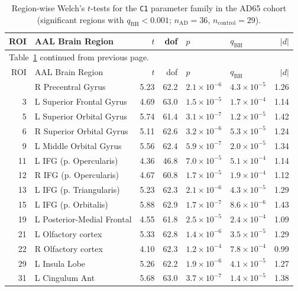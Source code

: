 \documentclass[11pt]{article}
\begin{document}
\begin{longtable}{r p{} r r l l r}
\caption{Region-wise Welch's $t$-tests for the \texttt{C1} parameter family in the AD65 cohort (significant regions with $q_{\mathrm{BH}}<0.001$; $n_{\mathrm{AD}}=36$, $n_{\mathrm{control}}=29$).}
\label{tab:supp_ad65_c1_stats}\\
\toprule
ROI & AAL Brain Region & $t$ & dof & $p$ & $q_{\mathrm{BH}}$ & $|d|$ \\
\midrule
\endfirsthead
\multicolumn{7}{l}{\small Table~\ref{tab:supp_ad65_c1_stats} continued from previous page.}\\
\toprule
ROI & AAL Brain Region & $t$ & dof & $p$ & $q_{\mathrm{BH}}$ & $|d|$ \\
\midrule
\endhead
\bottomrule
\endfoot
2  & R Precentral Gyrus & 5.23 & 62.2 & $2.1\times10^{-6}$ & $4.3\times10^{-5}$ & 1.26 \\
3  & L Superior Frontal Gyrus & 4.69 & 63.0 & $1.5\times10^{-5}$ & $1.7\times10^{-4}$ & 1.14 \\
5  & L Superior Orbital Gyrus & 5.74 & 61.4 & $3.1\times10^{-7}$ & $1.2\times10^{-5}$ & 1.42 \\
6  & R Superior Orbital Gyrus & 5.11 & 62.6 & $3.2\times10^{-6}$ & $5.3\times10^{-5}$ & 1.24 \\
9  & L Middle Orbital Gyrus & 5.56 & 62.4 & $5.9\times10^{-7}$ & $2.0\times10^{-5}$ & 1.34 \\
11 & L IFG (p. Opercularis) & 4.36 & 46.8 & $7.0\times10^{-5}$ & $5.1\times10^{-4}$ & 1.14 \\
12 & R IFG (p. Opercularis) & 4.67 & 60.8 & $1.7\times10^{-5}$ & $1.9\times10^{-4}$ & 1.12 \\
13 & L IFG (p. Triangularis) & 5.23 & 62.3 & $2.1\times10^{-6}$ & $4.3\times10^{-5}$ & 1.29 \\
15 & L IFG (p. Orbitalis) & 5.88 & 62.9 & $1.7\times10^{-7}$ & $8.6\times10^{-6}$ & 1.43 \\
19 & L Posterior-Medial Frontal & 4.55 & 61.8 & $2.5\times10^{-5}$ & $2.4\times10^{-4}$ & 1.09 \\
21 & L Olfactory cortex & 5.33 & 62.8 & $1.4\times10^{-6}$ & $3.5\times10^{-5}$ & 1.29 \\
22 & R Olfactory cortex & 4.10 & 62.3 & $1.2\times10^{-4}$ & $7.8\times10^{-4}$ & 0.99 \\
29 & L Insula Lobe & 5.26 & 62.2 & $1.9\times10^{-6}$ & $4.1\times10^{-5}$ & 1.27 \\
31 & L Cingulum Ant & 5.68 & 63.0 & $3.7\times10^{-7}$ & $1.4\times10^{-5}$ & 1.38 \\

\end{longtable}
\end{document}
